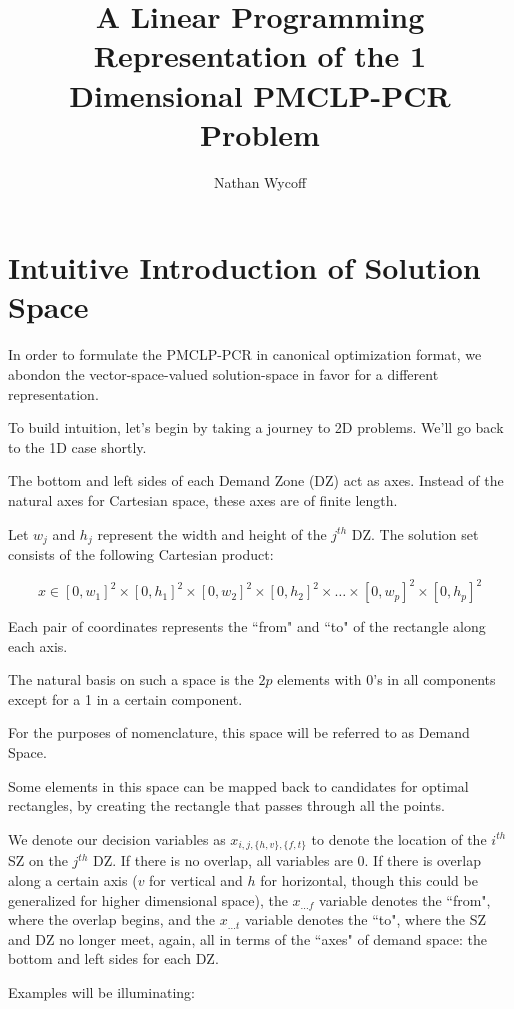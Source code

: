 \documentclass[a4paper]{article}
\title{A Linear Programming Representation of the 1 Dimensional PMCLP-PCR Problem}
\author{Nathan Wycoff}
\begin{document}
\maketitle

\section{Intuitive Introduction of Solution Space}

In order to formulate the PMCLP-PCR in canonical optimization format, we abondon the vector-space-valued solution-space in favor for a different representation.

To build intuition, let's begin by taking a journey to 2D problems. We'll go back to the 1D case shortly.

The bottom and left sides of each Demand Zone (DZ) act as axes. Instead of the natural axes for Cartesian space, these axes are of finite length.

Let $w_j$ and $h_j$ represent the width and height of the $j^{th}$ DZ. The solution set consists of the following Cartesian product:

$$x \in [0,w_1]^2 \times [0,h_1]^2 \times [0,w_2]^2 \times [0,h_2]^2 \times \ldots \times [0,w_p]^2 \times [0,h_p]^2$$

Each pair of coordinates represents the ``from" and ``to" of the rectangle along each axis. 

The natural basis on such a space is the $2p$ elements with 0's in all components except for a 1 in a certain component.

 For the purposes of nomenclature, this space will be referred to as Demand Space. 
 
 Some elements in this space can be mapped back to candidates for optimal rectangles, by creating the rectangle that passes through all the points.
 
 We denote our decision variables as $x_{i,j,\{h,v\}, \{f,t\}}$ to denote the location of the $i^{th}$ SZ on the $j^{th}$ DZ. If there is no overlap, all variables are 0. If there is overlap along a certain axis ($v$ for vertical and $h$ for horizontal, though this could be generalized for higher dimensional space), the $x_{...f}$ variable denotes the ``from", where the overlap begins, and the $x_{...t}$ variable denotes the ``to", where the SZ and DZ no longer meet, again, all in terms of the ``axes" of demand space: the bottom and left sides for each DZ.
 
 Examples will be illuminating:
 
\end{document}
